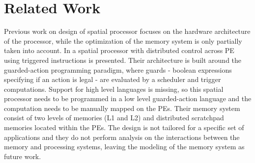 
\section{Related Work}






Previous work on design of spatial processor focuses on the hardware architecture of the processor, while the optimization of the memory system is only partially taken into account.
In \cite{parashar2014efficient} a spatial processor with distributed control across PE using triggered instructions is presented. Their architecture is built around the guarded-action programming paradigm, where guards - boolean expressions specifying if an action is legal - are evaluated by a scheduler and trigger computations. Support for high level languages is missing, so this spatial processor needs to be programmed in a low level guarded-action language and the computation needs to be manually mapped on the PEs. Their memory system consist of two levels of memories (L1 and L2) and distributed scratchpad memories located within the PEs. The design is not tailored for a specific set of applications and they do not perform analysis on the interactions between the memory and processing systems, leaving the modeling of the memory system as future work.

